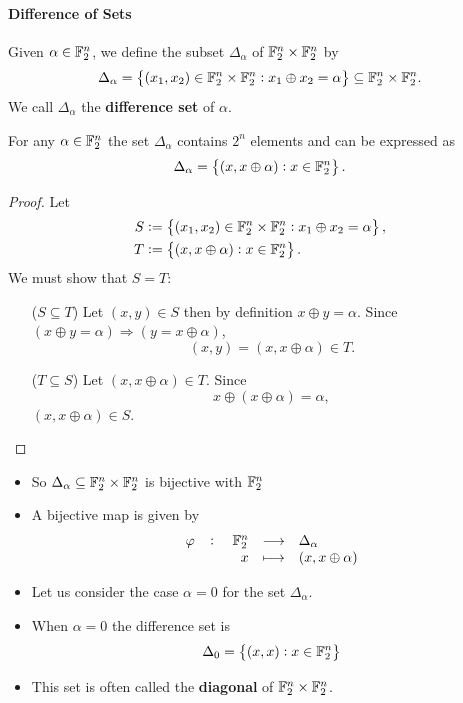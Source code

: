 \documentclass[11pt,openany]{article}
\begin{document}
\paragraph{Difference of Sets}
\begin{definition}
	Given $\alpha\in\mathbb{F}_2^n$, we define the subset $\Delta_\alpha$ of $\mathbb{F}_2^n\times\mathbb{F}_2^n$ by \[
	\Delta_\alpha=\set{(x_1,x_2)\in\mathbb{F}_2^n\times\mathbb{F}_2^n:x_1\oplus x_2=\alpha}\subseteq\mathbb{F}_2^n\times\mathbb{F}_2^n.
	\] We call $\Delta_\alpha$ the \textbf{difference set} of $\alpha$.
\end{definition}

\begin{proposition}
	For any $\alpha\in\mathbb{F}_2^n$ the set $\Delta_\alpha$ contains $2^n$ elements and can be expressed as \[
	\Delta_\alpha=\set{(x,x\oplus\alpha):x\in\mathbb{F}_2^n}.
	\]
\end{proposition}
\begin{proof}
	Let \begin{align*}
		S&:=\set{(x_1,x_2)\in\mathbb{F}_2^n\times\mathbb{F}_2^n:x_1\oplus x_2=\alpha}, \\
		T&:=\set{(x,x\oplus\alpha):x\in\mathbb{F}_2^n}.
	\end{align*} We must show that $S=T$:
	\begin{itemize}
		\item[($S\subseteq T$)] Let $(x,y)\in S$ then by definition $x\oplus y=\alpha$.
		Since $(x\oplus y=\alpha)\Rightarrow (y=x\oplus \alpha)$, \[
		(x,y)=(x,x\oplus \alpha)\in T.
		\]
		\item[($T\subseteq S$)] Let $(x,x\oplus\alpha)\in T$. Since \[
		x\oplus(x\oplus\alpha)=\alpha,
		\] $(x,x\oplus\alpha)\in S$.
	\end{itemize}
\end{proof}

\begin{itemize}
	\item So $\Delta_\alpha\subseteq\mathbb{F}_2^n\times\mathbb{F}_2^n$ is bijective with $\mathbb{F}_2^n$
	\item A bijective map is given by \[
	\fullfunction{\varphi}{\F_2^n}{\Delta_\alpha}{x}{(x,x\oplus\alpha)}
	\] 
\end{itemize}

\begin{itemize}
	\item Let us consider the case $\alpha=0$ for the set $\Delta_\alpha$.
	\item When $\alpha=0$ the difference set is \[
	\Delta_0=\set{(x,x):x\in\mathbb{F}_2^n}
	\]
	\item This set is often called the \textbf{diagonal} of $\mathbb{F}_2^n\times\mathbb{F}_2^n$.
\end{itemize}
\end{document}
